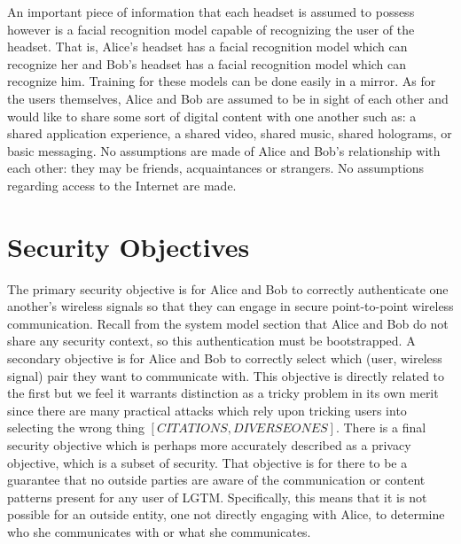 \documentclass[12pt,dvips]{report}
\begin{document}
An important piece of information that each headset is assumed to possess however is a facial recognition model capable of recognizing the user of the headset. That is, Alice's headset has a facial recognition model which can recognize her and Bob's headset has a facial recognition model which can recognize him. Training for these models can be done easily in a mirror.
As for the users themselves, Alice and Bob are assumed to be in sight of each other and would like to share some sort of digital content with one another such as: a shared application experience, a shared video, shared music, shared holograms, or basic messaging. No assumptions are made of Alice and Bob's relationship with each other: they may be friends, acquaintances or strangers.
No assumptions regarding access to the Internet are made. 

\section{Security Objectives}
The primary security objective is for Alice and Bob to correctly authenticate one another's wireless signals so that they can engage in secure point-to-point wireless communication. Recall from the system model section that Alice and Bob do not share any security context, so this authentication must be bootstrapped. 
A secondary objective is for Alice and Bob to correctly select which (user, wireless signal) pair they want to communicate with. This objective is directly related to the first but we feel it warrants distinction as a tricky problem in its own merit since there are many practical attacks which rely upon tricking users into selecting the wrong thing $[CITATIONS, DIVERSE ONES]$.
There is a final security objective which is perhaps more accurately described as a privacy objective, which is a subset of security. That objective is for there to be a guarantee that no outside parties are aware of the communication or content patterns present for any user of LGTM. Specifically, this means that it is not possible for an outside entity, one not directly engaging with Alice, to determine who she communicates with or what she communicates. 
\end{document}
